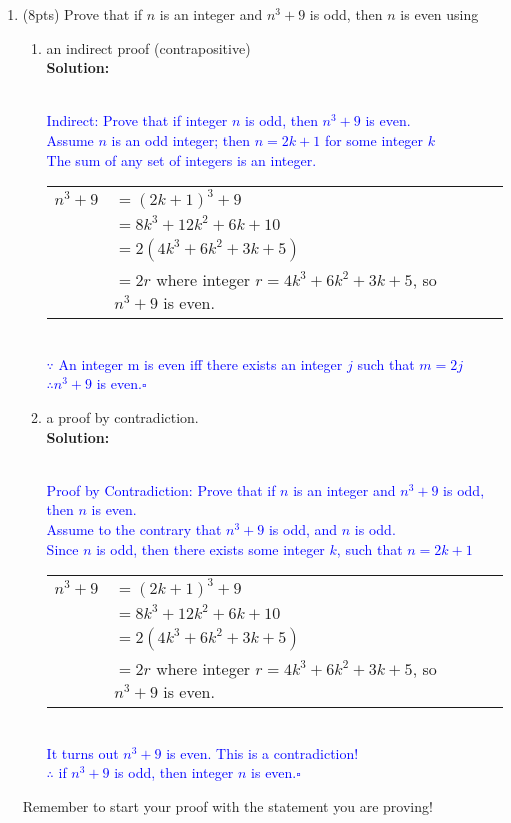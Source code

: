 \documentclass{article}
\newcommand{\sol}[1]{\textbf{Solution:\,}\textcolor{blue}{#1}}
\begin{document}
\begin{enumerate}
\newpage

\item(8pts) Prove that if $n$ is an integer and $n^3+9$ is odd, then $n$ is even using

\begin{enumerate}
\item an indirect proof (contrapositive)
\\\sol{
\\Indirect: Prove that if integer $n$ is odd, then $n^3+9$ is even.
\\Assume $n$ is an odd integer; then $n=2k+1$ for some integer $k$
\\The sum of any set of integers is an integer.
\\\begin{tabular}{rlll}
$n^3+9$&$=(2k+1)^3+9$\\
&$=8k^3+12k^2+6k+10$\\
&$=2(4k^3+6k^2+3k+5)$\\
&$=2r$ where integer $r=4k^3+6k^2+3k+5$, so $n^3+9$ is even.\\
\end{tabular}
\\$\because$ An integer m is even iff there exists an integer $j$ such that $m=2j$
\\$\therefore n^3+9$ is even.\hfill $\square$
}
\item a proof by contradiction.
\\\sol{\\
Proof by Contradiction: Prove that if $n$ is an integer and $n^3+9$ is odd, then $n$ is even.
\\Assume to the contrary that $n^3+9$ is odd, and $n$ is odd.
\\Since $n$ is odd, then there exists some integer $k$, such that $n=2k+1$
\\\begin{tabular}{rlll}
$n^3+9$&$=(2k+1)^3+9$\\
&$=8k^3+12k^2+6k+10$\\
&$=2(4k^3+6k^2+3k+5)$\\
&$=2r$ where integer $r=4k^3+6k^2+3k+5$, so $n^3+9$ is even.\\
\end{tabular}\\
It turns out $n^3+9$ is even. This is a contradiction!\\
$\therefore$ if $n^3+9$ is odd, then integer $n$ is even.\hfill $\square$
}
\end{enumerate} 
Remember to start your proof with the statement you are proving!


\end{enumerate}
\end{document}
